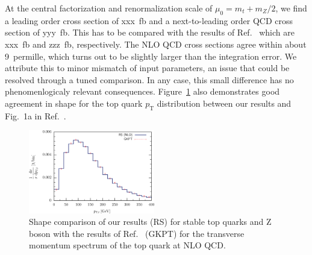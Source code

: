 \documentclass[preprint]{JHEP3} %
\begin{document}
At the central factorization and renormalization scale of $\mu_0=m_t+m_Z/2$, 
we find a leading order cross section of xxx~fb and a next-to-leading order QCD cross section of yyy~fb. 
This has to be compared with the results of Ref.~\cite{1208} which are xxx~fb and zzz~fb, respectively.
The NLO QCD cross sections agree within about 9~permille, which turns out to be slightly larger than the integration error.
We attribute this to minor mismatch of input parameters, an issue that could be resolved through a tuned comparison.  
In any case, this small difference has no phenomenlogicaly relevant consequences.
Figure~\ref{fig:i} also demonstrates good agreement in shape for the top quark $p_{\mathrm{T}}$ distribution between our results and Fig.~1a in Ref.~\cite{1208}.
\begin{figure}[t]
\centering %
\includegraphics[width=0.49\textwidth]{./Troc_pTtop.eps}
\caption{\label{fig:i} Shape comparison of our results (RS) for stable top quarks and Z boson with the results of Ref.~\cite{1208} (GKPT) for 
the transverse momentum spectrum of the top quark at NLO QCD. 
}
\end{figure}
\end{document}
